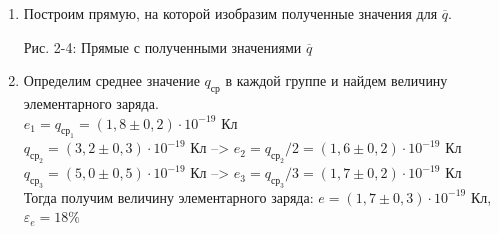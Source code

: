 \documentclass[a4paper, 12pt]{article}%
\begin{document}
\begin{enumerate}
	\newpage
\item Построим прямую, на которой изобразим полученные значения для $\overline{q}$. 
	
	\begin{figure}[H]
	\end{figure}
	
	\begin{figure}[H]
	\end{figure}
	
	\begin{figure}[H]
	\end{figure}
	\begin{center}
		Рис. 2-4: Прямые с полученными значениями $\overline{q}$
	\end{center} 
	
	\item Определим среднее значение $q_{\text{ср}}$ в каждой группе и найдем величину элементарного заряда.\\
	
	$e_1 = q_{\text{ср}_1} = (1,8 \pm 0,2) \cdot 10^{-19}$ Кл\\
	
	$q_{\text{ср}_2} = (3,2 \pm 0,3) \cdot 10^{-19}$ Кл   --> $e_2 = q_{\text{ср}_2} / 2 = (1,6 \pm 0,2)\cdot 10^{-19}$ Кл\\
	
	$q_{\text{ср}_3} = (5,0 \pm 0,5) \cdot 10^{-19}$ Кл  --> $e_3 = q_{\text{ср}_3} / 3 = (1,7 \pm 0,2)\cdot 10^{-19}$ Кл\\
	
	Тогда получим величину элементарного заряда: $e = (1,7 \pm 0,3) \cdot 10^{-19}$ Кл, $\varepsilon_e = 18\%$
	
	\end{enumerate}
	
\end{document}
